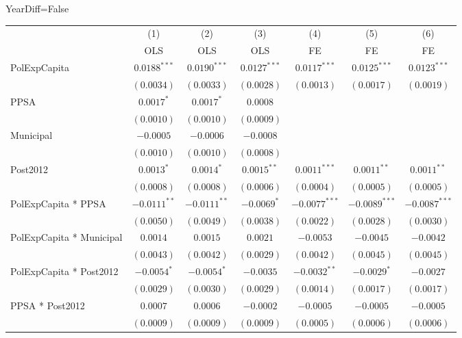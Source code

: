 \begin{table}[H]
    \centering
    \scriptsize
    \begin{minipage}{\textwidth}
    \centering
    {\normalsize YearDiff=False}
    \vspace{6pt}
    \begin{tabular}{lcccccc}
        \toprule
         & (1) & (2) & (3) & (4) & (5) & (6) \\
         & OLS & OLS & OLS & FE & FE & FE \\
        \midrule
        PolExpCapita & $0.0188^{***}$ & $0.0190^{***}$ & $0.0127^{***}$ & $0.0117^{***}$ & $0.0125^{***}$ & $0.0123^{***}$ \\
         & $(0.0034)$ & $(0.0033)$ & $(0.0028)$ & $(0.0013)$ & $(0.0017)$ & $(0.0019)$ \\[4pt]
        PPSA & $0.0017^{*}$ & $0.0017^{*}$ & $0.0008$ &  &  &  \\
         & $(0.0010)$ & $(0.0010)$ & $(0.0009)$ &  &  &  \\[4pt]
        Municipal & $-0.0005$ & $-0.0006$ & $-0.0008$ &  &  &  \\
         & $(0.0010)$ & $(0.0010)$ & $(0.0008)$ &  &  &  \\[4pt]
        Post2012 & $0.0013^{*}$ & $0.0014^{*}$ & $0.0015^{**}$ & $0.0011^{***}$ & $0.0011^{**}$ & $0.0011^{**}$ \\
         & $(0.0008)$ & $(0.0008)$ & $(0.0006)$ & $(0.0004)$ & $(0.0005)$ & $(0.0005)$ \\[4pt]
        PolExpCapita * PPSA & $-0.0111^{**}$ & $-0.0111^{**}$ & $-0.0069^{*}$ & $-0.0077^{***}$ & $-0.0089^{***}$ & $-0.0087^{***}$ \\
         & $(0.0050)$ & $(0.0049)$ & $(0.0038)$ & $(0.0022)$ & $(0.0028)$ & $(0.0030)$ \\[4pt]
        PolExpCapita * Municipal & $0.0014$ & $0.0015$ & $0.0021$ & $-0.0053$ & $-0.0045$ & $-0.0042$ \\
         & $(0.0043)$ & $(0.0042)$ & $(0.0029)$ & $(0.0042)$ & $(0.0045)$ & $(0.0045)$ \\[4pt]
        PolExpCapita * Post2012 & $-0.0054^{*}$ & $-0.0054^{*}$ & $-0.0035$ & $-0.0032^{**}$ & $-0.0029^{*}$ & $-0.0027$ \\
         & $(0.0029)$ & $(0.0030)$ & $(0.0029)$ & $(0.0014)$ & $(0.0017)$ & $(0.0017)$ \\[4pt]
        PPSA * Post2012 & $0.0007$ & $0.0006$ & $-0.0002$ & $-0.0005$ & $-0.0005$ & $-0.0005$ \\
         & $(0.0009)$ & $(0.0009)$ & $(0.0009)$ & $(0.0005)$ & $(0.0006)$ & $(0.0006)$ \\[4pt]

\end{tabular}
\end{minipage}
\end{table}
